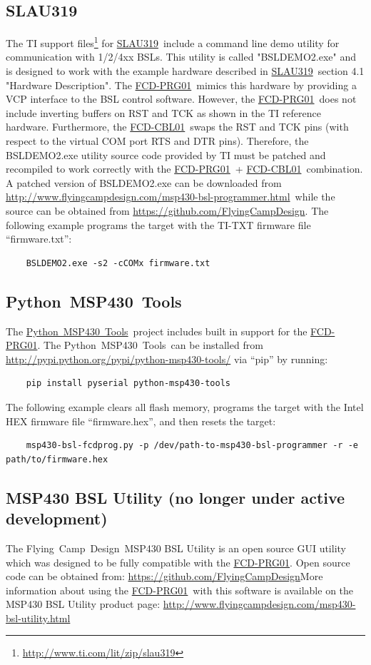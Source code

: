 \documentclass[10pt,letterpaper]{datasheet}
\newcommand{\PIDNOLINK}{FCD\nobreakdash-PRG01}
\newcommand{\PID}{\href{http://www.flyingcampdesign.com/msp430-bsl-programmer.html}{\PIDNOLINK}}
\newcommand{\PIDURL}{\href{http://www.flyingcampdesign.com/msp430-bsl-programmer.html}{http://www.flyingcampdesign.com/msp430-bsl-programmer.html}}
\newcommand{\PIDCBLNOLINK}{FCD-CBL01}
\newcommand{\PIDCBL}{\href{http://www.flyingcampdesign.com/msp430-bsl-programmer.html}{\PIDCBLNOLINK}}
\newcommand{\fcd}{Flying~Camp~Design}
\newcommand{\pmt}{Python~MSP430~Tools}
\newcommand{\pmturl}{\href{https://launchpad.net/python-msp430-tools/}{\pmt}}
\newcommand{\SLAUNOLINK}{SLAU319}
\newcommand{\SLAUPDF}{\href{http://www.ti.com/lit/pdf/SLAU319}{\SLAUNOLINK}}
\newcommand{\SLAUZIPURL}{\href{http://www.ti.com/lit/zip/slau319}{http://www.ti.com/lit/zip/slau319}}
\newcommand{\githuburl}{\href{http://github.com/FlyingCampDesign}{https://github.com/FlyingCampDesign}}
\newcommand{\fcdbslutility}{\href{http://www.flyingcampdesign.com/msp430-bsl-utility.html}{http://www.flyingcampdesign.com/msp430-bsl-utility.html}}
\begin{document}
\subsection*{\SLAUNOLINK}
The TI support files\footnote{\SLAUZIPURL} for \SLAUPDF\ include a command line demo utility for communication with 1/2/4xx BSLs.  This utility is called "BSLDEMO2.exe" and is designed to work with the example hardware described in \SLAUPDF\ section 4.1 "Hardware Description".  The \PID\ mimics this hardware by providing a VCP interface to the BSL control software.  However, the \PID\ does not include inverting buffers on RST and TCK as shown in the TI reference hardware.  Furthermore, the \PIDCBL\ swaps the RST and TCK pins (with respect to the virtual COM port RTS and DTR pins).  Therefore, the BSLDEMO2.exe utility source code provided by TI must be patched and recompiled to work correctly with the \PID\ + \PIDCBL\ combination.  A patched version of BSLDEMO2.exe can be downloaded from \PIDURL\ while the source can be obtained from \githuburl.  The following example programs the target with the TI-TXT firmware file ``firmware.txt'':
\begin{verbatim}
    BSLDEMO2.exe -s2 -cCOMx firmware.txt
\end{verbatim}

\subsection*{\pmt}
The \pmturl\ project includes built in support for the \PID.
The \pmt\ can be installed from \href{http://pypi.python.org/pypi/python-msp430-tools/}{http://pypi.python.org/pypi/python-msp430-tools/} via ``pip'' by running:
\begin{verbatim}
    pip install pyserial python-msp430-tools
\end{verbatim}
The following example clears all flash memory, programs the target with the Intel HEX firmware file ``firmware.hex'', and then resets the target:
\begin{verbatim}
    msp430-bsl-fcdprog.py -p /dev/path-to-msp430-bsl-programmer -r -e path/to/firmware.hex
\end{verbatim}

\subsection*{MSP430 BSL Utility (no longer under active development)}
The \fcd\ MSP430 BSL Utility is an open source GUI utility which was designed to be fully compatible with the \PID. Open source code can be obtained from: \githuburl \newline More information about using the \PID\ with this software is available on the MSP430 BSL Utility product page: \fcdbslutility
\end{document}
